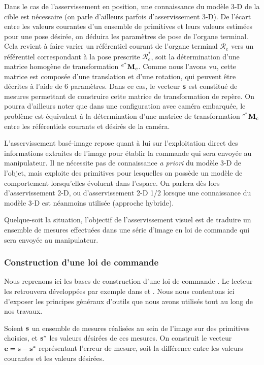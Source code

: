 Dans le cas de l'asservissement en position, une connaissance du modèle 3-D de 
la cible est nécessaire (on parle d'ailleurs parfois d'asservissement 3-D). De 
l'écart entre les valeurs courantes d'un ensemble de primitives et leurs valeurs 
estimées pour une pose désirée, on déduira les paramètres de pose de l'organe 
terminal. Cela revient à faire varier un référentiel courant de l'organe 
terminal $\mathcal R_e$ vers un référentiel correspondant à la pose prescrite 
$\mathcal R_e^*$, soit la détermination d'une matrice homogène de transformation 
${}^{e^*}{\bf M}_e$. Comme nous l'avons vu, cette matrice est composée d'une 
translation et d'une rotation, qui peuvent être décrites à l'aide de $6$ 
paramètres. Dans ce cas, le vecteur ${\bf s}$ est constitué de mesures 
permettant de construire cette matrice de transformation de repère. On pourra 
d'ailleurs noter que dans une configuration avec caméra embarquée, le problème 
est équivalent à la détermination d'une matrice de transformation ${}^{c^*}{\bf 
M}_c$ entre les référentiels courants et désirés de la caméra.

L'asservissement basé-image repose quant à lui sur l'exploitation direct des 
informations extraites de l'image pour établir la commande qui sera envoyée au 
manipulateur. Il ne nécessite pas de connaissance {\it a priori} du modèle 3-D 
de l'objet, mais exploite des primitives pour lesquelles on possède un modèle de 
comportement lorsqu'elles évoluent dans l'espace. On parlera dès lors 
d'asser\-vissement 2-D, ou d'asservissement 2-D 1/2 lorsque une connaissance du 
modèle 3-D est néanmoins utilisée (approche hybride).

Quelque-soit la situation, l'objectif de l'asservissement visuel est de traduire 
un ensemble de mesures effectuées dans une série d'image en loi de commande qui 
sera envoyée au manipulateur.

\subsubsection{Construction d'une loi de commande}\label{chap0-3-1-2}

Nous reprenons ici les bases de construction d'une loi de commande 
\cite{samson1991}. Le lecteur les retrouvera développées par exemple dans 
\cite{chaumette:tuto01} et \cite{chaumette:tuto02}. Nous nous contentons ici 
d'exposer les principes généraux d'outils que nous avons utilisés tout au long 
de nos travaux.

Soient ${\bf s}$ un ensemble de mesures réalisées au sein de l'image sur des 
primitives choisies, et ${\bf s}^*$ les valeurs désirées de ces mesures. On 
construit le vecteur ${\bf e} = {\bf s} - {\bf s}^*$ représentant l'erreur de 
mesure, soit la différence entre les valeurs courantes et les valeurs désirées.

